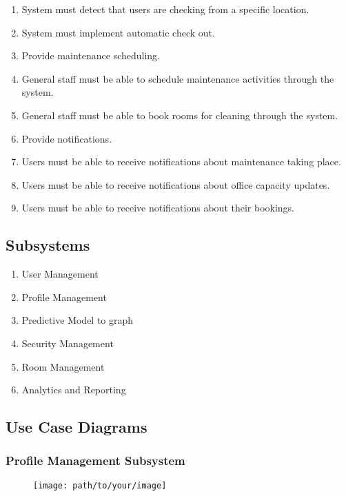 \documentclass[11pt,a4paper]{article}
\begin{document}
\begin{enumerate}[label=\arabic*.]
    \item System must detect that users are checking from a specific location.
    \item System must implement automatic check out.
    \item Provide maintenance scheduling.
    \item General staff must be able to schedule maintenance activities through the system.
    \item General staff must be able to book rooms for cleaning through the system.
    \item Provide notifications.
    \item Users must be able to receive notifications about maintenance taking place.
    \item Users must be able to receive notifications about office capacity updates.
    \item Users must be able to receive notifications about their bookings.
\end{enumerate}

\subsection*{Subsystems}
\begin{enumerate}
    \item User Management
    \item Profile Management
    \item Predictive Model to graph
    \item Security Management
    \item Room Management
    \item Analytics and Reporting
\end{enumerate}

\pagebreak

\subsection*{Use Case Diagrams}

\subsubsection*{Profile Management Subsystem}
\begin{figure}[htbp]
    \centering
    \texttt{[image: path/to/your/image]}
\end{figure}
\end{document}
